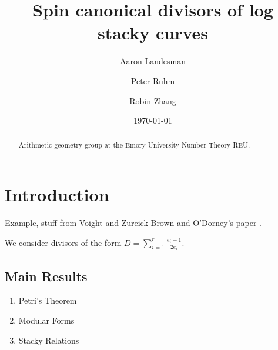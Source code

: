 \documentclass{amsart}
\title{Spin canonical divisors of log stacky curves}
\author{Aaron Landesman}
\author{Peter Ruhm}
\author{Robin Zhang}
\date{\today}
\theoremstyle{plain}
\theoremstyle{definition}
\theoremstyle{remark}
\numberwithin{equation}{section}
\newcommand \subhalf[1]{\frac{{#1} - 1}{2{#1}}}
\begin{document}
\begin{abstract}
  Arithmetic geometry group at the Emory University Number Theory
	REU.
\end{abstract}

\maketitle

\tableofcontents




\section{Introduction}

Example, stuff from Voight and Zureick-Brown \cite{vzb:stacky}
and O'Dorney's paper \cite{dorney:canonical}.



We consider divisors of the form $D = \sum_{i = 1}^{r} \subhalf{e_i}$.

\subsection{Main Results}
\begin{enumerate}
	\item Petri's Theorem
	\item Modular Forms
	\item Stacky Relations
\end{enumerate}
\end{document}
